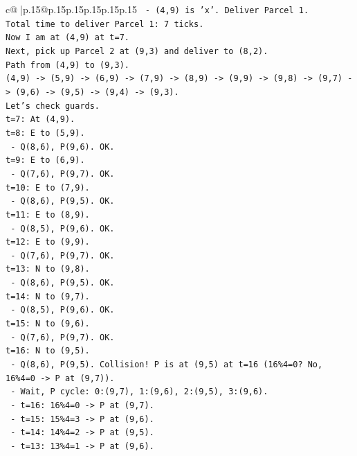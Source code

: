 \documentclass{article}
\begin{document}
{\begin{supertabular}{c@{$\;$}|p{.15\linewidth}@{}p{.15\linewidth}p{.15\linewidth}p{.15\linewidth}p{.15\linewidth}p{.15\linewidth}}
{{{\texttt{  {-} (4,9) is 'x'. Deliver Parcel 1.} \\
\texttt{Total time to deliver Parcel 1: 7 ticks.} \\
\texttt{Now I am at (4,9) at t=7.} \\
\texttt{Next, pick up Parcel 2 at (9,3) and deliver to (8,2).} \\
\texttt{Path from (4,9) to (9,3).} \\
\texttt{(4,9) {-}> (5,9) {-}> (6,9) {-}> (7,9) {-}> (8,9) {-}> (9,9) {-}> (9,8) {-}> (9,7) {-}> (9,6) {-}> (9,5) {-}> (9,4) {-}> (9,3).} \\
\texttt{Let's check guards.} \\
\texttt{t=7: At (4,9).} \\
\texttt{t=8: E to (5,9).} \\
\texttt{  {-} Q(8,6), P(9,6). OK.} \\
\texttt{t=9: E to (6,9).} \\
\texttt{  {-} Q(7,6), P(9,7). OK.} \\
\texttt{t=10: E to (7,9).} \\
\texttt{  {-} Q(8,6), P(9,5). OK.} \\
\texttt{t=11: E to (8,9).} \\
\texttt{  {-} Q(8,5), P(9,6). OK.} \\
\texttt{t=12: E to (9,9).} \\
\texttt{  {-} Q(7,6), P(9,7). OK.} \\
\texttt{t=13: N to (9,8).} \\
\texttt{  {-} Q(8,6), P(9,5). OK.} \\
\texttt{t=14: N to (9,7).} \\
\texttt{  {-} Q(8,5), P(9,6). OK.} \\
\texttt{t=15: N to (9,6).} \\
\texttt{  {-} Q(7,6), P(9,7). OK.} \\
\texttt{t=16: N to (9,5).} \\
\texttt{  {-} Q(8,6), P(9,5). Collision! P is at (9,5) at t=16 (16\%4=0? No, 16\%4=0 {-}> P at (9,7)).} \\
\texttt{  {-} Wait, P cycle: 0:(9,7), 1:(9,6), 2:(9,5), 3:(9,6).} \\
\texttt{  {-} t=16: 16\%4=0 {-}> P at (9,7).} \\
\texttt{  {-} t=15: 15\%4=3 {-}> P at (9,6).} \\
\texttt{  {-} t=14: 14\%4=2 {-}> P at (9,5).} \\
\texttt{  {-} t=13: 13\%4=1 {-}> P at (9,6).} \\
}}}
\end{supertabular}}
\end{document}
